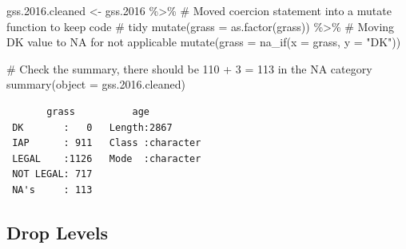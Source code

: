\documentclass[
  letterpaper,
  DIV=11,
  numbers=noendperiod]{scrreprt}
\newenvironment{Shaded}{\begin{snugshade}}{\end{snugshade}}
\newcommand{\AttributeTok}[1]{\textcolor[rgb]{0.40,0.45,0.13}{#1}}
\newcommand{\CommentTok}[1]{\textcolor[rgb]{0.37,0.37,0.37}{#1}}
\newcommand{\FloatTok}[1]{\textcolor[rgb]{0.68,0.00,0.00}{#1}}
\newcommand{\FunctionTok}[1]{\textcolor[rgb]{0.28,0.35,0.67}{#1}}
\newcommand{\NormalTok}[1]{\textcolor[rgb]{0.00,0.23,0.31}{#1}}
\newcommand{\OtherTok}[1]{\textcolor[rgb]{0.00,0.23,0.31}{#1}}
\newcommand{\SpecialCharTok}[1]{\textcolor[rgb]{0.37,0.37,0.37}{#1}}
\newcommand{\StringTok}[1]{\textcolor[rgb]{0.13,0.47,0.30}{#1}}
\begin{document}
\begin{Shaded}
\begin{Highlighting}[]
\NormalTok{gss.}\FloatTok{2016.}\NormalTok{cleaned }\OtherTok{\textless{}{-}}\NormalTok{ gss}\FloatTok{.2016} \SpecialCharTok{\%\textgreater{}\%}
    \CommentTok{\# Moved coercion statement into a mutate function to keep code}
    \CommentTok{\# tidy}
\FunctionTok{mutate}\NormalTok{(}\AttributeTok{grass =} \FunctionTok{as.factor}\NormalTok{(grass)) }\SpecialCharTok{\%\textgreater{}\%}
    \CommentTok{\# Moving DK value to NA for not applicable}
\FunctionTok{mutate}\NormalTok{(}\AttributeTok{grass =} \FunctionTok{na\_if}\NormalTok{(}\AttributeTok{x =}\NormalTok{ grass, }\AttributeTok{y =} \StringTok{"DK"}\NormalTok{))}

\CommentTok{\# Check the summary, there should be 110 + 3 = 113 in the NA category}
\FunctionTok{summary}\NormalTok{(}\AttributeTok{object =}\NormalTok{ gss.}\FloatTok{2016.}\NormalTok{cleaned)}
\end{Highlighting}
\end{Shaded}

\begin{verbatim}
       grass          age           
 DK       :   0   Length:2867       
 IAP      : 911   Class :character  
 LEGAL    :1126   Mode  :character  
 NOT LEGAL: 717                     
 NA's     : 113                     
\end{verbatim}

\subsection{Drop Levels}\label{drop-levels}
\end{document}
